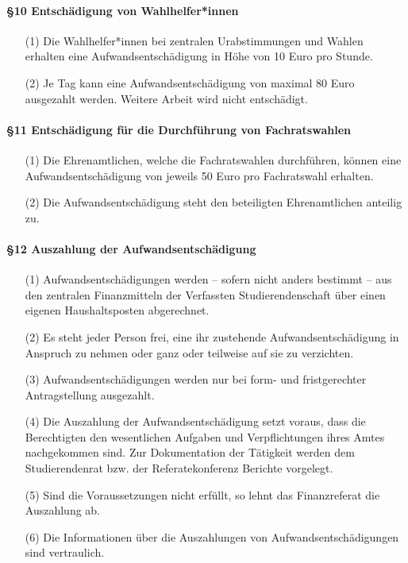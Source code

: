        \paragraph{§10 Entschädigung von Wahlhelfer*innen}
            \begin{itemize}
                \item[(1)] Die Wahlhelfer*innen bei zentralen Urabstimmungen und Wahlen erhalten eine Aufwandsentschädigung in Höhe von 10 Euro pro Stunde.
                \item[(2)] Je Tag kann eine Aufwandsentschädigung von maximal 80 Euro ausgezahlt werden. Weitere Arbeit wird nicht entschädigt. 
            \end{itemize} 
        \paragraph{§11 Entschädigung für die Durchführung von Fachratswahlen}
            \begin{itemize}
                \item[(1)]  Die Ehrenamtlichen, welche die Fachratswahlen durchführen, können eine Aufwandsentschädigung von jeweils 50 Euro pro Fachratswahl erhalten. 
                \item[(2)]  Die Aufwandsentschädigung steht den beteiligten Ehrenamtlichen anteilig zu. 
            \end{itemize}
        \paragraph{§12 Auszahlung der Aufwandsentschädigung}
            \begin{itemize}
                \item[(1)]  Aufwandsentschädigungen werden – sofern nicht anders bestimmt – aus den zentralen Finanzmitteln der Verfassten Studierendenschaft über einen eigenen Haushaltsposten abgerechnet.
                \item[(2)] Es steht jeder Person frei, eine ihr zustehende Aufwandsentschädigung in Anspruch zu nehmen oder ganz oder teilweise auf sie zu verzichten.
                \item[(3)]  Aufwandsentschädigungen werden nur bei form- und fristgerechter Antragstellung ausgezahlt. 
                \item[(4)]  Die Auszahlung der Aufwandsentschädigung setzt voraus, dass die Berechtigten den wesentlichen Aufgaben und Verpflichtungen ihres Amtes nachgekommen sind. Zur Dokumentation der Tätigkeit werden dem Studierendenrat bzw. der Referatekonferenz Berichte vorgelegt.
                \item[(5)] Sind die Voraussetzungen nicht erfüllt, so lehnt das Finanzreferat die Auszahlung ab. 
                \item[(6)]  Die Informationen über die Auszahlungen von Aufwandsentschädigungen sind vertraulich. 
            \end{itemize}

